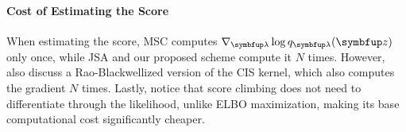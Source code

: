 \vspace{-0.05in}
\paragraph{Cost of Estimating the Score}
When estimating the score, MSC computes \(\nabla_{\vlambda} \log q_{\vlambda}(\vz)\) only once, while JSA and our proposed scheme compute it \(N\) times.
However,~\cite{NEURIPS2020_b2070693} also discuss a Rao-Blackwellized version of the CIS kernel, which also computes the gradient \(N\) times.
Lastly, notice that score climbing does not need to differentiate through the likelihood, unlike ELBO maximization, making its base computational cost significantly cheaper.



